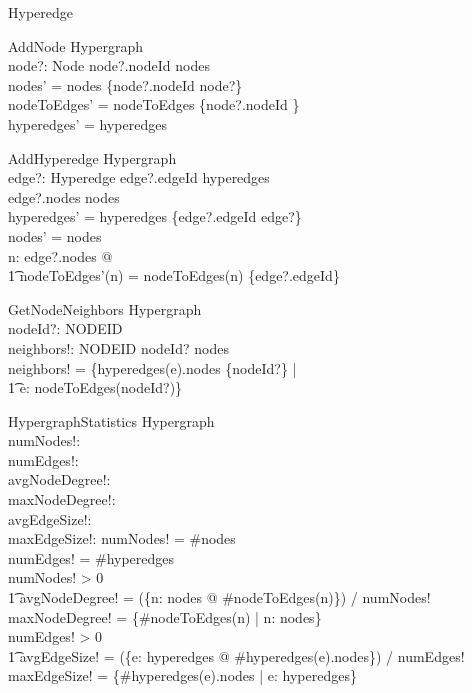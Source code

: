 \documentclass{article}
\begin{document}
\begin{class}{Hyperedge}
\begin{schema}{AddNode}
    \Delta Hypergraph \\
    node?: Node
\where
    node?.nodeId \notin \dom nodes \\
    nodes' = nodes \cup \{node?.nodeId \mapsto node?\} \\
    nodeToEdges' = nodeToEdges \cup \{node?.nodeId \mapsto \emptyset\} \\
    hyperedges' = hyperedges
\end{schema}

\begin{schema}{AddHyperedge}
    \Delta Hypergraph \\
    edge?: Hyperedge
\where
    edge?.edgeId \notin \dom hyperedges \\
    edge?.nodes \subseteq \dom nodes \\
    hyperedges' = hyperedges \cup \{edge?.edgeId \mapsto edge?\} \\
    nodes' = nodes \\
    \forall n: edge?.nodes @ \\
    \t1 nodeToEdges'(n) = nodeToEdges(n) \cup \{edge?.edgeId\}
\end{schema}

\begin{schema}{GetNodeNeighbors}
    \Xi Hypergraph \\
    nodeId?: NODEID \\
    neighbors!: \power NODEID
\where
    nodeId? \in \dom nodes \\
    neighbors! = \bigcup \{hyperedges(e).nodes \setminus \{nodeId?\} | \\
    \t1 e: nodeToEdges(nodeId?)\}
\end{schema}

\begin{schema}{HypergraphStatistics}
    \Xi Hypergraph \\
    numNodes!: \nat \\
    numEdges!: \nat \\
    avgNodeDegree!: \real \\
    maxNodeDegree!: \nat \\
    avgEdgeSize!: \real \\
    maxEdgeSize!: \nat
\where
    numNodes! = \#nodes \\
    numEdges! = \#hyperedges \\
    numNodes! > 0 \implies \\
    \t1 avgNodeDegree! = (\sum \{n: \dom nodes @ \#nodeToEdges(n)\}) / numNodes! \\
    maxNodeDegree! = \max \{\#nodeToEdges(n) | n: \dom nodes\} \\
    numEdges! > 0 \implies \\
    \t1 avgEdgeSize! = (\sum \{e: \dom hyperedges @ \#hyperedges(e).nodes\}) / numEdges! \\
    maxEdgeSize! = \max \{\#hyperedges(e).nodes | e: \dom hyperedges\}
\end{schema}


\end{class}
\end{document}

